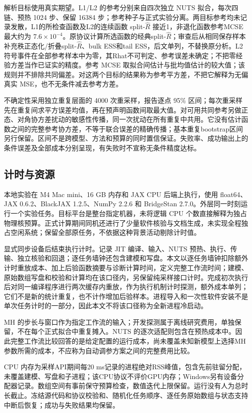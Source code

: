 \documentclass[UTF8,fontset=fandol,zihao=-4]{ctexart}
\begin{document}
解析目标使用真实期望。L1/L2 的参考分别来自四次独立 NUTS 拟合，每次四链、预热 1024 步、保留 16384 步；参考种子与正式实验分离。两目标参考均未记录发散，L1的所检查函数及L2的连续函数 split-$\hat R$ 接近1，非退化函数参考MCSE最大约为 $7.6\times10^{-4}$。原协议计算所选函数的经典split-$\hat R$；审查后从相同保存样本补充秩正态化/折叠split-$\hat R$、bulk ESS和tail ESS，后文单列，不替换原分析。L2符号事件在全部参考样本中为零，其Rhat不可判定、参考误差未确定；不把零经验方差当作已证实的精度。参考 MCSE 取拟合间估计与批均值估计的较大值；该规则并不排除共同偏差。对这两个目标的结果称为参考平方差，不把它解释为无偏真实 MSE，也不无条件减去参考方差。

不确定性采用独立重复层面的 4000 次重采样，报告逐点 95\% 区间；每次重采样先在重复间求平方误差均值，再在预声明函数间取最大值。对可用共同参考另做正态、对角协方差扰动的敏感性传播，同一次扰动在所有重复中共用。它没有估计函数之间的完整参考协方差，不等于联合误差的精确传播；基本重复bootstrap区间另行保留。区间不是跨模型、方法和预算的同时置信保证。失败率、成功输出上的条件误差及全部成本分别呈现，有失败时不宣称无条件精度达标。

\subsection{计时与资源}
本地实验在 M4 Mac mini、16 GB 内存和 JAX CPU 后端上执行，使用 float64、JAX 0.6.2、BlackJAX 1.2.5、NumPy 2.2.6 和 BridgeStan 2.7.0。外层同一时刻运行一个实验任务。目标平台是整台指定机器，未将逻辑 CPU 个数直接解释为独占物理核预算。正式计算期间同机还进行了少量软件核验与文档生成，未实现全程独占空闲系统；保留全部原任务，不依据这种背景活动剔除计时值。

显式同步设备后结束执行计时。记录 JIT 编译、输入、NUTS 预热、执行、传输、独立核验和回退；逐任务墙钟还包含建模和写盘。本文以逐任务墙钟扣除额外计时重放成本、加上后验函数摘要与诊断计算时间，定义完整工作流时间；建模、原始数组写盘和校验和计算均在该口径内，另保留纯采样接口计时。完成初次执行后对同一编译程序进行两次缓存内重放，作为执行机制计时探测，额外成本单列；它们不是新的统计重复，也不计作增加后验样本。进程导入和一次性软件安装不是单次任务计时的一部分，因此本文不将该口径称为全新进程冷启动。

MH 的步长与窗口作为指定工作流的输入；开发探测属于离线研究费用，单独保留，不在每个正式拟合中重复摊入。NUTS 的逐次适配则包含在预热成本中。因此完整工作流比较回答的是给定配置的运行成本，尚未覆盖未知新模型上选择MH参数所需的成本，不应称为自动调参方案之间的完整费用比较。

CPU 内存为采样API期间每20 ms记录的进程绝对RSS峰值，包含先前驻留分配，未覆盖建模、写盘和子进程；该CPU协议不评价GPU内存；Windows另有设备分配器记录。数组空间有事前保守预算检查，数值迭代上限保留。运行没有人为总时长截止。冻结源代码和协议校验和、随机化任务顺序、逐任务原始数组与状态支持中断后恢复；成功与失败结果均保留。
\end{document}
